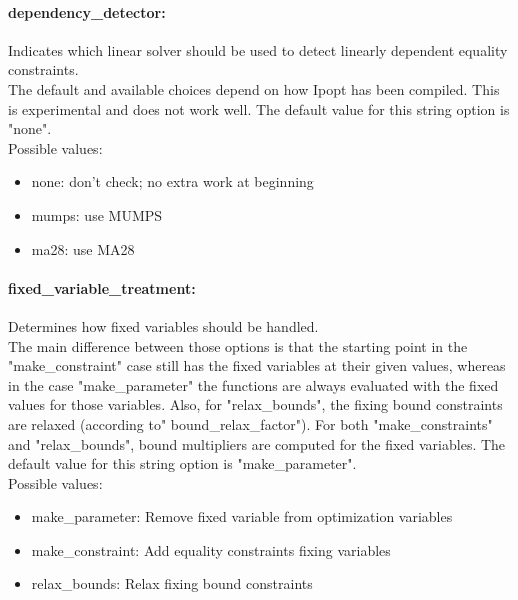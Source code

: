 \paragraph{dependency\_detector:}\label{sec:dependency_detector} Indicates which linear solver should be used to detect linearly dependent equality constraints. $\;$ \\
 The default and available choices depend on how
Ipopt has been compiled.  This is experimental
and does not work well.
The default value for this string option is "none".
\\ 
Possible values:
\begin{itemize}
   \item none: don't check; no extra work at beginning
   \item mumps: use MUMPS
   \item ma28: use MA28
\end{itemize}

\paragraph{fixed\_variable\_treatment:}\label{sec:fixed_variable_treatment} Determines how fixed variables should be handled. $\;$ \\
 The main difference between those options is that
the starting point in the "make\_constraint" case
still has the fixed variables at their given
values, whereas in the case "make\_parameter" the
functions are always evaluated with the fixed
values for those variables.  Also, for
"relax\_bounds", the fixing bound constraints are
relaxed (according to" bound\_relax\_factor").
For both "make\_constraints" and "relax\_bounds",
bound multipliers are computed for the fixed
variables.
The default value for this string option is "make\_parameter".
\\ 
Possible values:
\begin{itemize}
   \item make\_parameter: Remove fixed variable from optimization
variables
   \item make\_constraint: Add equality constraints fixing variables
   \item relax\_bounds: Relax fixing bound constraints
\end{itemize}

